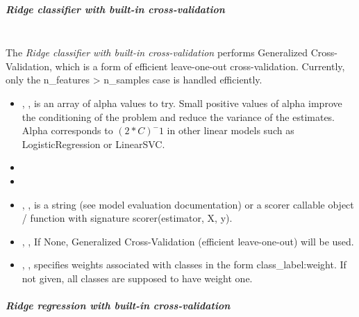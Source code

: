\subparagraph{Ridge classifier with built-in cross-validation}
\mbox{}
\\The \textit{Ridge classifier with built-in cross-validation} performs
Generalized Cross-Validation, which is a form of efficient leave-one-out
cross-validation.
%
Currently, only the n\_features > n\_samples case is handled efficiently.
%
\begin{itemize}
  \item {}, , is an
  array of alpha values to try.
  Small positive values of alpha improve the conditioning of the problem and
  reduce the variance of the estimates.
  Alpha corresponds to $(2*C)^-1$ in other linear models such as
  LogisticRegression or LinearSVC.
  \item {}
  \item {}
  \item {}, , is a
  string (see model evaluation documentation) or a scorer callable object /
  function with signature scorer(estimator, X, y).
  \item {}, ,
  If None, Generalized Cross-Validation (efficient leave-one-out) will be used.
  \item {}, , specifies 
  weights associated with classes in the form {class\_label:weight}.
  If not given, all classes are supposed to have weight one.
\end{itemize}

\subparagraph{Ridge regression with built-in cross-validation}
\mbox{}

